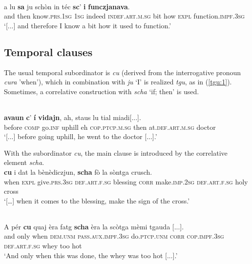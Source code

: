 \ea
\label{}
\\
	\gll [...] a lu \textbf{sa} ju schòn in téc \textbf{sc}’ \textbf{i} \textbf{funczjanava}.   \\
{} and then know.\textsc{prs.1sg} \textsc{1sg} indeed \textsc{indef.art.m.sg} bit how \textsc{expl} function.\textsc{impf.3sg}\\
\glt `[...] and therefore I know a bit how it used to function.'
\z


\subsection{Temporal clauses}
The usual temporal subordinator is \textit{cu} (derived from the interrogative pronoun \textit{cura} 'when'), which in combination with \textit{ju} `I' is realized \textit{tgu}, as in (\ref{tgu:1}). Sometimes, a correlative construction with \textit{scha} `if; then' is used.

\ea
\label{tgu:1}
\\
\gll  [...] \textbf{avaun} \textbf{c}’ \textbf{í} \textbf{vidajn}, ah, staus lu tial miadi[...]. \\
{} before \textsc{comp} go.\textsc{inf} uphill eh \textsc{cop.ptcp.m.sg} then  at.\textsc{def.art.m.sg} doctor\\
\glt `[...] before going uphill, he went to the doctor [...].'
\z

With the subordinator \textit{cu}, the main clause is introduced by the correlative element \textit{scha}.
\ea
\label{}
\\
\gll  […] \textbf{cu} i dat la bènèdiczjun, \textbf{scha} fò la sòntga crusch.\\
    […] when \textsc{expl} give.\textsc{prs.3sg} \textsc{def.art.f.sg} blessing \textsc{corr} make.\textsc{imp.2sg} \textsc{def.art.f.sg} holy cross\\
\glt `[…] when it comes to the blessing, make the sign of the cross.'
\z

\ea
\label{}
\\
	\gll  A pér \textbf{cu} quaj èra fatg \textbf{scha} èra la scòtga mèmi tgauda [...].  \\
and only when \textsc{dem.unm} \textsc{pass.aux.impf.3sg} do.\textsc{ptcp.unm} \textsc{corr} \textsc{cop.impf.3sg} \textsc{def.art.f.sg} whey too hot\\
\glt `And only when this was done, the whey was too hot [...].'
\z


